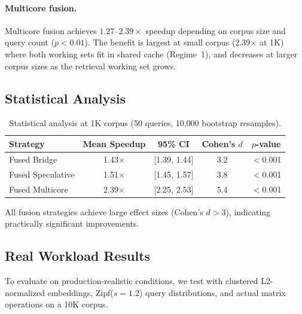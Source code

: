 \documentclass{article}
\theoremstyle{definition}
\theoremstyle{remark}
\begin{document}
\paragraph{Multicore fusion.}
Multicore fusion achieves $1.27$--$2.39\times$ speedup depending on corpus size and query count ($p < 0.01$).
The benefit is largest at small corpus (2.39$\times$ at 1K) where both working sets fit in shared cache (Regime~1), and decreases at larger corpus sizes as the retrieval working set grows.

\subsection{Statistical Analysis}

\begin{table}[t]
\centering
\caption{Statistical analysis at 1K corpus (50 queries, 10{,}000 bootstrap resamples).}\label{tab:stats}
\smallskip
\begin{tabular}{@{}lcccc@{}}
\toprule
\textbf{Strategy} & \textbf{Mean Speedup} & \textbf{95\% CI} & \textbf{Cohen's $d$} & \textbf{$p$-value} \\
\midrule
Fused Bridge     & 1.43$\times$ & [1.39, 1.44] & 3.2 & $<$0.001 \\
Fused Speculative & 1.51$\times$ & [1.45, 1.57] & 3.8 & $<$0.001 \\
Fused Multicore  & 2.39$\times$ & [2.25, 2.53] & 5.4 & $<$0.001 \\
\bottomrule
\end{tabular}
\end{table}

All fusion strategies achieve large effect sizes (Cohen's $d > 3$), indicating practically significant improvements.

\subsection{Real Workload Results}

To evaluate on production-realistic conditions, we test with clustered L2-normalized embeddings, Zipf($s{=}1.2$) query distributions, and actual matrix operations on a 10K corpus.
\end{document}

